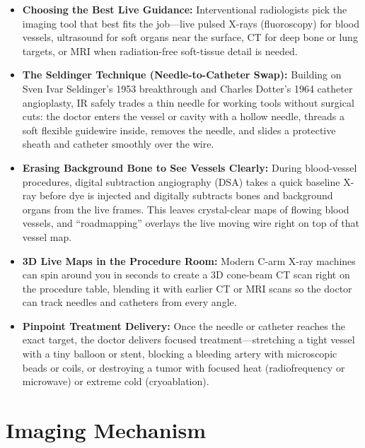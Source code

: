 \begin{itemize}
    \item \textbf{Choosing the Best Live Guidance:} Interventional radiologists pick the imaging tool that best fits the job---live pulsed X-rays (fluoroscopy) for blood vessels, ultrasound for soft organs near the surface, CT for deep bone or lung targets, or MRI when radiation-free soft-tissue detail is needed.
    \item \textbf{The Seldinger Technique (Needle-to-Catheter Swap):} Building on Sven Ivar Seldinger's 1953 breakthrough and Charles Dotter's 1964 catheter angioplasty, IR safely trades a thin needle for working tools without surgical cuts: the doctor enters the vessel or cavity with a hollow needle, threads a soft flexible guidewire inside, removes the needle, and slides a protective sheath and catheter smoothly over the wire.
    \item \textbf{Erasing Background Bone to See Vessels Clearly:} During blood-vessel procedures, digital subtraction angiography (DSA) takes a quick baseline X-ray before dye is injected and digitally subtracts bones and background organs from the live frames. This leaves crystal-clear maps of flowing blood vessels, and ``roadmapping'' overlays the live moving wire right on top of that vessel map.
    \item \textbf{3D Live Maps in the Procedure Room:} Modern C-arm X-ray machines can spin around you in seconds to create a 3D cone-beam CT scan right on the procedure table, blending it with earlier CT or MRI scans so the doctor can track needles and catheters from every angle.
    \item \textbf{Pinpoint Treatment Delivery:} Once the needle or catheter reaches the exact target, the doctor delivers focused treatment---stretching a tight vessel with a tiny balloon or stent, blocking a bleeding artery with microscopic beads or coils, or destroying a tumor with focused heat (radiofrequency or microwave) or extreme cold (cryoablation).
\end{itemize}

\section{Imaging Mechanism}

